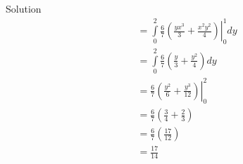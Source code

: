 \documentclass{article}
\begin{document}
\begin{spacing}{1.1}
\begin{homeworkProblem}
\begin{enumerate}[(a)]
\begin{homeworkSection}{Solution}
\begin{align*}
            &= \int\limits_0^2 \frac{ 6}{ 7} \left.
              \left( \frac{ y x^3}{ 3} + \frac{ x^2 y^2}{ 4}\right)\right|_0^1 dy\\
            &= \int\limits_0^2 \frac{ 6}{ 7}
              \left( \frac{ y}{ 3} + \frac{ y^2}{ 4}\right) dy\\
            &= \frac{ 6}{ 7} \left.
              \left( \frac{ y^2}{ 6} + \frac{ y^3}{ 12}\right)\right|_0^2 \\
            &= \frac{ 6}{ 7} \left( \frac{ 3}{ 4} + \frac{ 2}{ 3}\right)\\
            &= \frac{ 6}{ 7} \left( \frac{ 17}{ 12}\right)\\
            &= \frac{ 17}{ 14}\\
        \end{align*}

      \end{homeworkSection}
  \end{enumerate}
\end{homeworkProblem}


\end{spacing}
\end{document}
